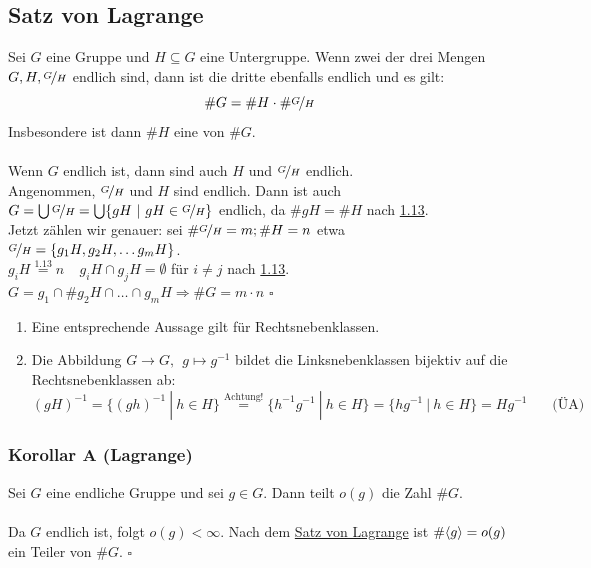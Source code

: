 \subsection{Satz von Lagrange}
\label{sub:satz_von_lagrange}
Sei $G$ eine Gruppe und $H\subseteq G$ eine Untergruppe. Wenn zwei der drei Mengen $G,H,\nicefrac{G}{H}$ endlich sind, dann ist die dritte ebenfalls endlich und es gilt:\\
\[\#G=\#H \cdot \#\nicefrac{G}{H} \]
Insbesondere ist dann $\#H$ eine  von $\#G$.\\
\vfill
{}\\
Wenn $G$ endlich ist, dann sind auch $H$ und $\nicefrac{G}{H}$ endlich.\\
Angenommen, $\nicefrac{G}{H}$ und $H$ sind endlich. Dann ist auch $G= \bigcup \nicefrac{G}{H}=\bigcup\{gH~|~gH\in \nicefrac{G}{H} \}$ endlich, da $\#gH=\#H$ nach \hyperref[sub:nebenklassen]{1.13}.\\
Jetzt zählen wir genauer: sei $\#\nicefrac{G}{H}=m; \#H=n$ etwa $\nicefrac{G}{H}=\{g_1H,g_2H,\dots g_mH \}$.\\
$g_iH\stackrel{\hyperref[sub:nebenklassen]{1.13}}{=}n~~~~~g_iH\cap g_jH=\emptyset$ für $i\not=j$ nach \hyperref[sub:nebenklassen]{1.13}.\\
$G=g_1\cap \#g_2H\cap \dots \cap g_mH \Rightarrow \#G=m\cdot n$
\hfill $\square$

\begin{enumerate}[(1)]
	\item Eine entsprechende Aussage gilt für Rechtsnebenklassen.
	\item Die Abbildung $G \to G,~~g\mapsto g^{-1}$ bildet die Linksnebenklassen bijektiv auf die Rechtsnebenklassen ab:
	\[
	(gH)^{-1}=\{(gh)^{-1}~|~h \in H \} \stackrel{\text{Achtung!}}{=}\{h^{-1}g^{-1}~|~h \in H \}=\{hg^{-1}~|~h\in H \}=Hg^{-1}~~~~~~~~\text{(ÜA)}
	\]
\end{enumerate}

\subsubsection*{Korollar A (Lagrange)}
Sei $G$ eine endliche Gruppe und sei $g\in G$. Dann teilt $o(g)$ die Zahl $\#G$.\\
\\
Da $G$ endlich ist, folgt $o(g)<\infty$. Nach dem \hyperref[sub:satz_von_lagrange]{Satz von Lagrange} ist $\#\langle g \rangle=o(g)$ ein Teiler von $\#G$.
\hfill $\square$

